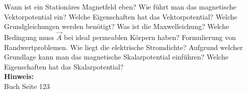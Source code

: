 \begin{question}[section=3,subsection=34,name={Stationäre Ebene magnetische Felder},difficulty=4,type=mdl,tags={}]
	Wann ist ein Stationäres Magnetfeld eben? Wie führt man das magnetische Vektorpotential ein? Welche Eigenschaften hat das Vektorpotential? Welche Grundgleichungen werden benötigt? Was ist die Maxwelleichung? Welche Bedingung muss $\vec A$ bei ideal permeablen Körpern haben? Formulierung von Randwertproblemen. Wie liegt die elektrische Stromdichte? Aufgrund welcher Grundlage kann man das magnetische Skalarpotential einführen? Welche Eigenschaften hat das Skalarpotential?
	\\ \textbf{Hinweis:}\\
	Buch Seite 123
\end{question}
\begin{solution}
	
\end{solution}